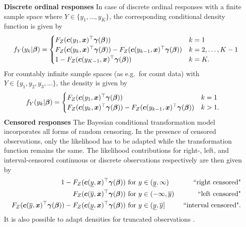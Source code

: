 \documentclass[12pt]{article}
\theoremstyle{plain}
\begin{document}
\noindent\textbf{Discrete ordinal responses} In case of discrete ordinal responses with a finite sample space where $Y \in \{y_1, \ldots, y_K\}$, the corresponding conditional density function is given by
\begin{align}\label{disc_ll}
\begin{split}
f_Y(y_k |\text{\boldmath$\beta$})=
\begin{cases}
    F_Z(\text{\boldmath$c$}(y_1,\text{\boldmath$x$})^\top \text{\boldmath$\gamma$}(\text{\boldmath$\beta$})) & k = 1\\
     F_Z(\text{\boldmath$c$}(y_k,\text{\boldmath$x$})^\top \text{\boldmath$\gamma$}(\text{\boldmath$\beta$})) - F_Z(\text{\boldmath$c$}(y_{k-1},\text{\boldmath$x$})^\top \text{\boldmath$\gamma$}(\text{\boldmath$\beta$})) & k = 2, \ldots, K-1\\
     1 - F_Z(\text{\boldmath$c$}(y_{K-1},\text{\boldmath$x$})^\top \text{\boldmath$\gamma$}(\text{\boldmath$\beta$})) & k = K.\\
    \end{cases}
    \end{split}
\end{align}
For countably infinite sample spaces (as e.g.\ for count data) with $Y \in \{y_1,y_2,y_3, \ldots\}$, the density is given by
\begin{align}\label{count_ll}
f_Y(y_k |\text{\boldmath$\beta$}) &=\begin{cases}
     F_Z(\text{\boldmath$c$}(y_1,\text{\boldmath$x$})^\top \text{\boldmath$\gamma$}(\text{\boldmath$\beta$})) & k = 1\\
     F_Z(\text{\boldmath$c$}(y_k,\text{\boldmath$x$})^\top \text{\boldmath$\gamma$}(\text{\boldmath$\beta$})) - F_Z(\text{\boldmath$c$}(y_{k-1},\text{\boldmath$x$})^\top \text{\boldmath$\gamma$}(\text{\boldmath$\beta$})) & k >1.
    \end{cases}
\end{align}
\noindent\textbf{Censored responses} The Bayesian conditional transformation model incorporates all forms of random censoring. In the presence of censored observations, only the likelihood has to be adapted while the transformation function remains the same. The likelihood contributions for right-, left, and interval-censored continuous or discrete observations respectively are then given by
\begin{align}
     1 - F_Z(\text{\boldmath$c$}(\underline{y},\text{\boldmath$x$})^\top\text{\boldmath$\gamma$}(\text{\boldmath$\beta$})) & \text{ for } y \in (\underline{y}, \infty) & \text{ ``right censored"}\nonumber\\
     F_Z(\text{\boldmath$c$}(\overline{y},\text{\boldmath$x$})^\top\text{\boldmath$\gamma$}(\text{\boldmath$\beta$}))    & \text{ for } y \in (-\infty, \overline{y}) & \text{ ``left censored"}\label{cens_ll}\\
     F_Z(\text{\boldmath$c$}(\overline{y},\text{\boldmath$x$})^\top\text{\boldmath$\gamma$}(\text{\boldmath$\beta$})) - F_Z(\text{\boldmath$c$}(\underline{y},\text{\boldmath$x$})^\top\text{\boldmath$\gamma$}(\text{\boldmath$\beta$})) &  \text{ for } y \in (\underline{y}, \overline{y}] & \text{ ``interval censored"}.\nonumber
\end{align}%
It is also possible to adapt  densities for truncated observations \citep{hothorn2018}.
\end{document}
